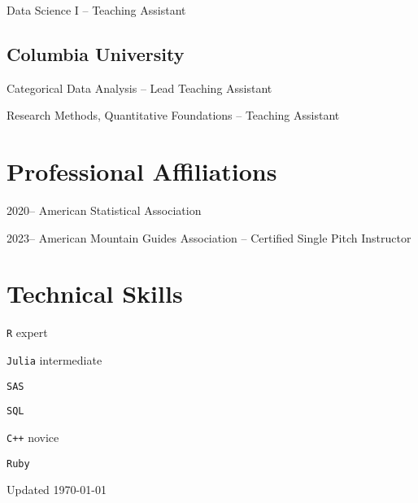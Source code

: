 \documentclass[12pt,letterpaper]{report}
\newcommand{\listitemspace}{0.15em}
\renewenvironment{itemize}
{\begin{list}{}{\setlength{\leftmargin}{0em}
            \setlength{\parskip}{0em}
            \setlength{\itemsep}{\listitemspace}
            \setlength{\parsep}{\listitemspace}}}
    {\end{list}}
\begin{document}
    \begin{itemize}
    
    	\item Data Science I -- Teaching Assistant
    
    \end{itemize}

    \subsection*{Columbia University}
    
    \begin{itemize}
    	
    	\item Categorical Data Analysis -- Lead Teaching Assistant
    	\item Research Methods, Quantitative Foundations -- Teaching Assistant
    
    \end{itemize}

    \section*{Professional Affiliations}

    \begin{tablist}

        \item[2020--] \tab American Statistical Association
        
        	\item[2023--] \tab American Mountain Guides Association -- Certified Single Pitch Instructor

    \end{tablist}

    \section*{Technical Skills}

    \begin{itemize}

        \item \texttt{R} \tab expert
        
        \item \texttt{Julia} \tab intermediate
        
        	\item \texttt{SAS}

		\item \texttt{SQL}
        
        \item \texttt{C++} \tab novice
        
        \item \texttt{Ruby}

    \end{itemize}

    \begin{center}
        \vfill
        Updated \monthyeardate\today
    \end{center}
\end{document}
